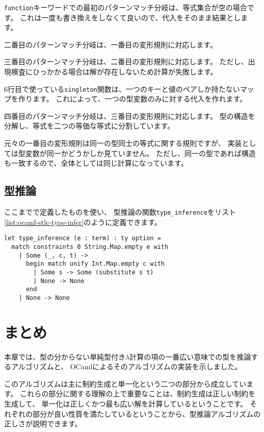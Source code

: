 \texttt{function}キーワードでの最初のパターンマッチ分岐は、等式集合が空の場合です。
これは一度も書き換えをしなくて良いので、代入をそのまま結果とします。

二番目のパターンマッチ分岐は、一番目の変形規則に対応します。

三番目のパターンマッチ分岐は、二番目の変形規則に対応します。
ただし、出現検査にひっかかる場合は解が存在しないため計算が失敗します。

6行目で使っている\texttt{singleton}関数は、一つのキーと値のペアしか持たないマップを作ります。
これによって、一つの型変数のみに対する代入を作れます。

四番目のパターンマッチ分岐は、三番目の変形規則に対応します。
型の構造を分解し、等式を二つの等価な等式に分割しています。

元々の一番目の変形規則は同一の型同士の等式に関する規則ですが、
実装としては型変数が同一かどうかしか見ていません。
ただし、同一の型であれば構造も一致するので、全体としては同じ計算になっています。

\subsection{型推論}

ここまでで定義したものを使い、
型推論の関数\texttt{type\_inference}をリスト\ref{list:ocaml-stlc-type-infer}のように定義できます。

\begin{lstlisting}[caption=型推論, label=list:ocaml-stlc-type-infer]
let type_inference (e : term) : ty option =
  match constraints 0 String.Map.empty e with
    | Some (_, c, t) ->
      begin match unify Int.Map.empty c with
        | Some s -> Some (substitute s t)
        | None -> None
      end
    | None -> None
\end{lstlisting}

\section{まとめ}

本章では、型の分からない単純型付き$\lambda$計算の項の一番広い意味での型を推論するアルゴリズムと、
OCamlによるそのアルゴリズムの実装を示しました。

このアルゴリズムは主に制約生成と単一化という二つの部分から成立しています。
これらの部分に関する理解の上で重要なことは、制約生成は正しい制約を生成して、
単一化は正しくかつ最も広い解を計算しているということです。
それぞれの部分が良い性質を満たしているということから、型推論アルゴリズムの正しさが説明できます。

